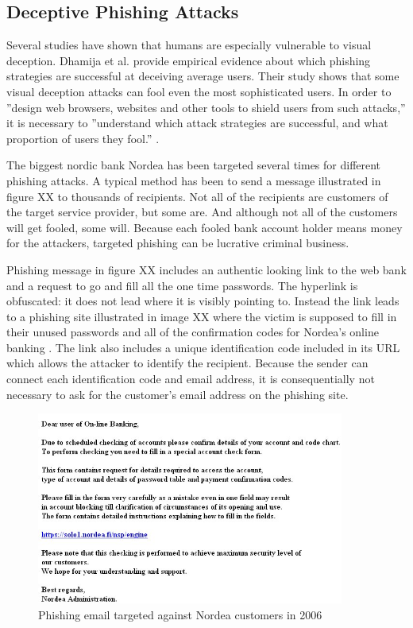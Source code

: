 \documentclass{tktltiki}
\begin{document}
\subsection{Deceptive Phishing Attacks}

    Several studies have shown \cite{visual_similarity_phishing_2008, why_phishing_works_06, suspectibility_to_phishing_2006} that humans are especially vulnerable to visual deception. Dhamija et al. \cite{why_phishing_works_06} provide empirical evidence about which phishing strategies are successful at deceiving average users. Their study shows that some visual deception attacks can fool even the most sophisticated users. In order to ''design web browsers, websites and other tools to shield users from such attacks,'' it is necessary to ''understand which attack strategies are successful, and what proportion of users they fool.'' \cite{why_phishing_works_06}
.

    The biggest nordic bank Nordea has been targeted several times for different phishing attacks. A typical method has been to send a message illustrated in figure XX to thousands of recipients. Not all of the recipients are customers of the target service provider, but some are. And although not all of the customers will get fooled, some will. Because each fooled bank account holder means money for the attackers, targeted phishing can be lucrative criminal business.

      Phishing message in figure XX includes an authentic looking link to the web bank and a request to go and fill all the one time passwords. The hyperlink is obfuscated: it does not lead where it is visibly pointing to. Instead the link leads to a phishing site illustrated in image XX where the victim is supposed to fill in their unused passwords and all of the confirmation codes for Nordea's online banking \cite{nordea_fsecure_2006, nordea_miller_2006}. The link also includes a unique identification code included in its URL which allows the attacker to identify the recipient. Because the sender can connect each identification code and email address, it is consequentially not necessary to ask for the customer's email address on the phishing site.
      
          
\begin{figure}
  \centering
  \includegraphics[width=0.9\textwidth]{images/nordea_phishing_email.jpg}
  \caption{Phishing email targeted against Nordea customers in 2006}
  \label{fig:nordea_phishing_email}
\end{figure}
\end{document}
